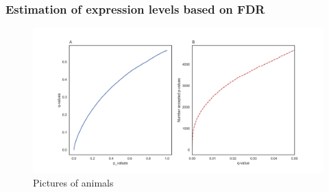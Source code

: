 \documentclass[11pt]{article}
\begin{document}
	\subsubsection {Estimation of expression levels based on FDR}
\begin{figure}[bh]
    \centering
      \includegraphics[width=\textwidth]{comb.png}
    \caption{Pictures of animals}\label{fig:animals}
\end{figure}



\end{document}
